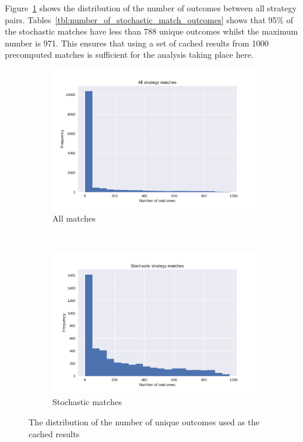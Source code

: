 \documentclass{article}
\begin{document}
Figure~\ref{fig:number_of_stochastic_match_outcomes} shows the distribution of
the number of outcomes between all strategy pairs.
Tables~\ref{tbl:number_of_stochastic_match_outcomes} shows that 95\% of the
stochastic matches have less than 788 unique outcomes whilst the maximum number
is 971. This ensures that using a set of cached results from 1000 precomputed
matches is sufficient for the analysis taking place here.

\begin{figure}[!hbtp]
    \centering
    \begin{subfigure}[t]{.5\textwidth}
        \centering
        \includegraphics[width=.9\textwidth]{./img/number_of_match_outcomes.pdf}
        \caption{All matches}
    \end{subfigure}%
    ~
    \begin{subfigure}[t]{.5\textwidth}
        \centering
        \includegraphics[width=.9\textwidth]{./img/number_of_stochastic_match_outcomes.pdf}
        \caption{Stochastic matches}
    \end{subfigure}%
    \caption{The distribution of the number of unique outcomes used as the
    cached results}
    \label{fig:number_of_stochastic_match_outcomes}
\end{figure}
\end{document}
